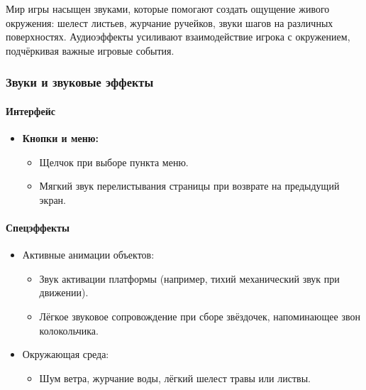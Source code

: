 \documentclass{article}
\begin{document}
Мир игры насыщен звуками, которые помогают создать ощущение живого окружения: шелест листьев, журчание ручейков, звуки шагов на различных поверхностях. Аудиоэффекты усиливают взаимодействие игрока с окружением, подчёркивая важные игровые события.

\subsubsection{Звуки и звуковые эффекты}
\paragraph{Интерфейс}  
\begin{itemize}
    \item \textbf{Кнопки и меню:}  
    \begin{itemize}
        \item Щелчок при выборе пункта меню.  
        \item Мягкий звук перелистывания страницы при возврате на предыдущий экран.  
    \end{itemize}
\end{itemize}

\paragraph{Спецэффекты}  
\begin{itemize}
    \item Активные анимации объектов:  
    \begin{itemize}
        \item Звук активации платформы (например, тихий механический звук при движении).  
        \item Лёгкое звуковое сопровождение при сборе звёздочек, напоминающее звон колокольчика.  
    \end{itemize}
    \item Окружающая среда:  
    \begin{itemize}
        \item Шум ветра, журчание воды, лёгкий шелест травы или листвы.   
    \end{itemize}
\end{itemize}
\end{document}
